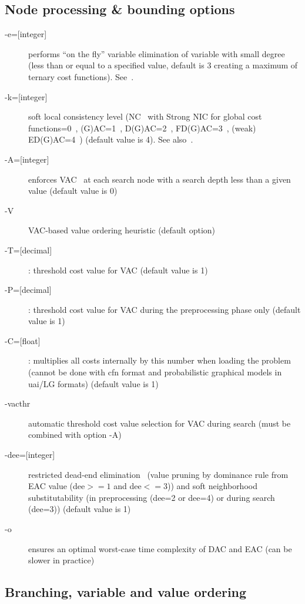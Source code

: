 \documentclass{article}
\begin{document}
\subsection{Node processing \& bounding options}

\begin{description}
\item[{-e=[integer]}] performs ``on the fly'' variable elimination of variable with small
  degree (less than or equal to a specified value, default is 3 creating a
  maximum of ternary cost functions). See~\cite{Larrosa00}.
\item[{-k=[integer]}] soft local consistency level (NC~\cite{Larrosa2002} with Strong NIC for global cost functions=0~\cite{LL2009}, (G)AC=1~\cite{Schiex00b,Larrosa2002}, D(G)AC=2~\cite{CooperFCSP}, FD(G)AC=3~\cite{Larrosa2003}, (weak) ED(G)AC=4~\cite{Heras05,LL2010}) (default value is 4). See also~\cite{Cooper10a,LL2012asa}.
\item[{-A=[integer]}] enforces VAC~\cite{Cooper08} at each search node with a search depth less than a given value (default value is 0)
\item[{-V}] VAC-based value ordering heuristic (default option)
\item[{-T=[decimal]}] : threshold cost value for VAC (default value is 1)
\item[{-P=[decimal]}] : threshold cost value for VAC during the preprocessing phase only (default value is 1)
\item[{-C=[float]}] : multiplies all costs internally by this number when loading the problem (cannot be done with cfn format and probabilistic graphical models in uai/LG formats) (default value is 1)
\item[-vacthr] automatic threshold cost value selection for VAC during search (must be combined with option -A)
\item[{-dee=[integer]}] restricted dead-end elimination~\cite{Givry13a} (value pruning by dominance rule from EAC value (dee$>=1$ and dee$<=3$)) and soft neighborhood substitutability (in preprocessing (dee=2 or dee=4) or during search (dee=3)) (default value is 1)
\item[-o] ensures an optimal worst-case time complexity of DAC and EAC (can be slower in practice)
\end{description}

\subsection{Branching, variable and value ordering}
\end{document}
